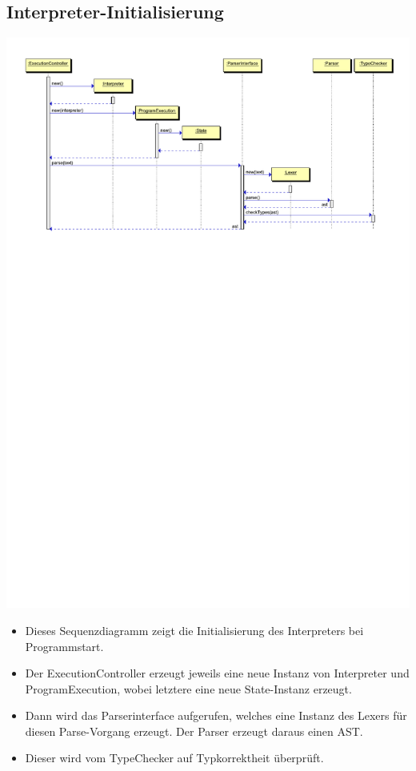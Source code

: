 \documentclass[10pt,a4paper,titlepage]{article}
\begin{document}
\subsection{Interpreter-Initialisierung}
\includegraphics[scale=0.9]{images/interpreter_init.pdf} \newline
\begin{itemize}
\item Dieses Sequenzdiagramm zeigt die Initialisierung des Interpreters bei Programmstart.
\item Der ExecutionController erzeugt jeweils eine neue Instanz von Interpreter und ProgramExecution, wobei letztere eine neue State-Instanz erzeugt.
\item Dann wird das Parserinterface aufgerufen, welches eine Instanz des Lexers für diesen Parse-Vorgang erzeugt. Der Parser erzeugt daraus einen AST.
\item Dieser wird vom TypeChecker auf Typkorrektheit überprüft.
\end{itemize}
\end{document}
